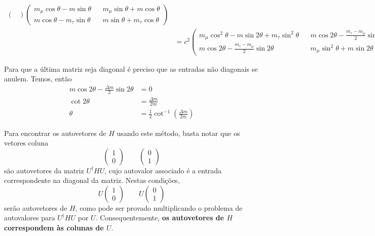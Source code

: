 \documentclass[a4paper, 12pt, notitlepage]{article}
\begin{document}
\begin{enumerate}
\begin{enumerate}[(A)]
\begin{align*}
\begin{pmatrix}
  \end{pmatrix} \begin{pmatrix}
  m_\mu \cos \theta - m \sin \theta && m_\mu \sin \theta + m \cos \theta \\
  m\cos \theta - m_\tau \sin \theta && m\sin \theta + m_\tau \cos \theta
  \end{pmatrix} \\
  &= c^2 \begin{pmatrix}
  m_\mu \cos^2 \theta - m \sin 2\theta + m_\tau \sin^2 \theta && m \cos 2\theta - \frac{m_\tau - m_\mu}{2} \sin 2\theta \\
  m \cos 2\theta - \frac{m_\tau - m_\mu}{2} \sin 2\theta && m_\mu \sin^2 \theta + m \sin 2\theta + m_\tau \cos^2 \theta
  \end{pmatrix}
  \end{align*}
  
  Para que a última matriz seja diagonal é preciso que as entradas não diagonais se anulem. Temos, então
  \begin{align*}
  m\cos 2\theta - \frac{\Delta m}{2} \sin 2\theta &= 0 \\
  \cot 2\theta &= \frac{\Delta m}{2 m} \\
  \theta &= \frac{1}{2} \cot^{-1} \left(\frac{\Delta m}{2m}\right)
  \end{align*}
  
  Para encontrar os autovetores de $H$ usando este método, basta notar que os vetores coluna
  \[ \begin{pmatrix}1 \\ 0\end{pmatrix} \qquad \begin{pmatrix} 0 \\ 1 \end{pmatrix} \]
  \noindent são autovetores da matriz $U^\dagger H U$, cujo autovalor associado é a entrada correspondente na diagonal da matriz. Nestas condições,
  \[ U\begin{pmatrix} 1 \\ 0\end{pmatrix} \qquad U\begin{pmatrix} 0 \\ 1 \end{pmatrix} \]
  \noindent serão autovetores de $H$, como pode ser provado multiplicando o problema de autovalores para $U^\dagger H U$ por $U$. Consequentemente, \textbf{os autovetores de $H$ correspondem às colunas de $U$}. 
  
\end{enumerate}


\end{enumerate}
\end{document}
